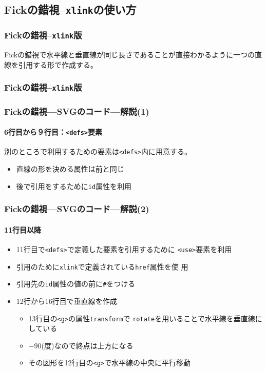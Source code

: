 \subsection{Fickの錯視--\texttt{xlink}の使い方}
\begin{frame}[containsverbatim]
 \frametitle{Fickの錯視--\texttt{xlink}版}
Fickの錯視で水平線と垂直線が同じ長さであることが直接わかるように一つの直
 線を引用する形で作成する。
\end{frame}
\begin{frame}[containsverbatim]
 \frametitle{Fickの錯視--\texttt{xlink}版}
\end{frame}
\begin{frame}[containsverbatim]
 \frametitle{Fickの錯視---SVGのコード---解説(1)}
 \framesubtitle{6行目から９行目：\texttt{<defs>}要素}
別のところで利用するための要素は\texttt{<defs>}内に用意する。
 \begin{itemize}
	\item 直線の形を決める属性は前と同じ
	\item 後で引用をするために\texttt{id}属性を利用
 \end{itemize}
\end{frame}
\begin{frame}[containsverbatim]
\frametitle{Fickの錯視---SVGのコード---解説(2)}
 \framesubtitle{11行目以降}
 \begin{itemize}
	\item 11行目で\texttt{<defs>}で定義した要素を引用するために
				\texttt{<use>}要素を利用
	\item 引用のために\texttt{xlink}で定義されている\texttt{href}属性を使
				用
	\item 引用先の\texttt{id}属性の値の前に\texttt{\#}をつける
	\item 12行から16行目で垂直線を作成
				\begin{itemize}
				 \item 13行目の\texttt{<g>}の属性\texttt{transform}で
							 \texttt{rotate}を用いることで水平線を垂直線にしている
				 \item $-90$(度)なので終点は上方になる
				 \item その図形を12行目の\texttt{<g>}で水平線の中央に平行移動
				\end{itemize}
 \end{itemize}
\end{frame}
